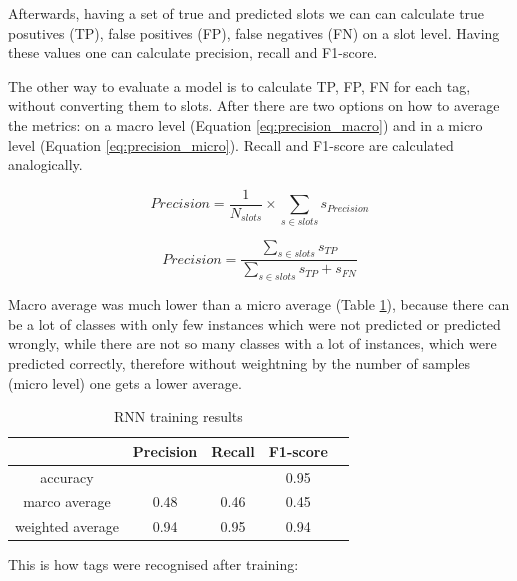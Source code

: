 \documentclass[12pt,titlepage,a4paper]{article}
\begin{document}
Afterwards, having a set of true and predicted slots we can can calculate true posutives (TP), false positives (FP), false negatives (FN) on a slot level. Having these values one can calculate precision, recall and F1-score.

The other way to evaluate a model is to calculate TP, FP, FN for each tag, without converting them to slots. After there are two options on how to average the metrics: on a macro level (Equation \ref{eq:precision_macro}) and in a micro level (Equation \ref{eq:precision_micro}). Recall and F1-score are calculated analogically.

\begin{equation}
    Precision = \frac{1}{N_{slots}} \times \sum_{s \in slots}{s_{Precision}}
    \label{eq:precision_macro}
\end{equation}

\begin{equation}
    Precision = \frac{\sum_{s \in slots}{s_{TP}}}{\sum_{s \in slots}{s_{TP} + s_{FN}}}
    \label{eq:precision_micro}
\end{equation}

Macro average was much lower than a micro average (Table \ref{RNNMetrics}), because there can be a lot of classes with only few instances which were not predicted or predicted wrongly, while there are not so many classes with a lot of instances, which were predicted correctly, therefore without weight\-ning by the number of samples (micro level) one gets a lower average.

\begin{table}[!h]
    \centering
    \begin{tabular}{ | c | c | c | c | c |}
        \hline
                        & Precision & Recall & F1-score \\
        \hline
        accuracy        &           &        & 0.95 \\
        \hline
        marco average   & 0.48      & 0.46   & 0.45 \\
        \hline
        weighted average& 0.94      & 0.95   & 0.94 \\
        \hline
    \end{tabular}
    \caption{RNN training results}
    \label{RNNMetrics}
\end{table}

This is how tags were recognised after training: 
\begin{center}
\end{center}
\end{document}
